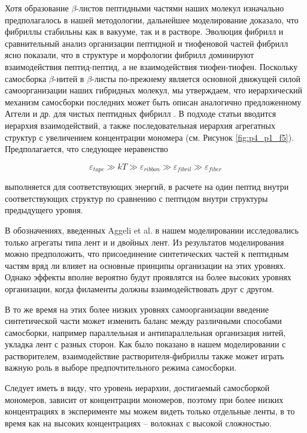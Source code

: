    Хотя образование $\beta$-листов пептидными частями наших молекул изначально предполагалось в нашей методологии, дальнейшее моделирование доказало, что фибриллы стабильны как в вакууме, так и в растворе. Эволюция фибрилл и сравнительный анализ организации пептидной и тиофеновой частей фибрилл ясно показали, что в структуре и морфологии фибрилл доминируют взаимодействия пептид-пептид, а не взаимодействия тиофен-тиофен. Поскольку самосборка $\beta$-нитей в $\beta$-листы по-прежнему является основной движущей силой самоорганизации наших гибридных молекул, мы утверждаем, что иерархический механизм самосборки последних может быть описан аналогично предложенному Аггели и др. для чистых пептидных фибрилл \cite{aggeli_hierarchical_2001}. В подходе статьи \cite{aggeli_hierarchical_2001} вводится иерархия взаимодействий, а также последовательная иерархия агрегатных структур с увеличением концентрации мономера (см. Рисунок \ref{fig:p4_p1_f5}). Предполагается, что следующее неравенство
    
\begin{equation}
    \varepsilon_{tape} \gg kT \gg \varepsilon_{ribbon} \gg \varepsilon_{fibril} \gg \varepsilon_{fiber}
\end{equation}
    
    выполняется для соответствующих энергий, в расчете на один пептид внутри соответствующих структур по сравнению с пептидом внутри структуры предыдущего уровня.
    
    В обозначениях, введенных Aggeli et al. в нашем моделировании исследовались только агрегаты типа лент и и двойных лент. Из результатов моделирования можно предположить, что присоединение синтетических частей к пептидным частям вряд ли влияет на основные принципы организации на этих уровнях. Однако эффекты вполне вероятно будут проявлятся на более высоких уровнях организации, когда филаменты должны взаимодействовать друг с другом.
    
    В то же время на этих более низких уровнях самоорганизации введение синтетической части может изменить баланс между различными способами самосборки, например параллельная и антипараллельная организация нитей, укладка лент с разных сторон. Как было показано в нашем моделировании с растворителем, взаимодействие растворителя-фибриллы также может играть важную роль в выборе предпочтительного режима самосборки.

    Следует иметь в виду, что уровень иерархии, достигаемый самосборкой мономеров, зависит от концентрации мономеров, поэтому при более низких концентрациях в эксперименте мы можем видеть только отдельные ленты, в то время как на высоких концентрациях -- волокнах с высокой сложностью.
    
